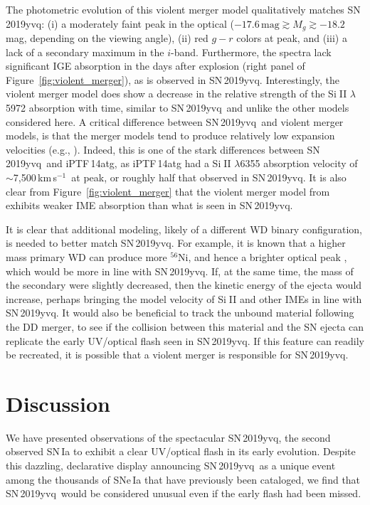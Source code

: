 \documentclass[twocolumn]{aastex63}
\def\ion#1#2{#1$\;${\footnotesize\rm{#2}}\relax}
\newcommand{\kms}{km\,s$^{-1}$}
\newcommand{\radni}{$^{56}$Ni}
\newcommand{\sn}{SN\,2019yvq}
\begin{document}
The photometric evolution of this violent merger model qualitatively matches
\sn: (i) a moderately faint peak in the optical ($-17.6\,\mathrm{mag} \gtrsim
M_g \gtrsim -18.2$\,mag, depending on the viewing angle), (ii) red $g - r$
colors at peak, and (iii) a lack of a secondary maximum in the $i$-band.
Furthermore, the spectra lack significant IGE absorption in the days after
explosion (right panel of Figure~\ref{fig:violent_merger}), as is observed in
\sn. Interestingly, the violent merger model does show a decrease in the
relative strength of the \ion{Si}{II} $\lambda$5972 absorption with time,
similar to \sn\ and unlike the other models considered here. A critical
difference between \sn\ and violent merger models, is that the merger models
tend to produce relatively low expansion velocities (e.g.,
\citealt{Pakmor10,Kromer13a,Kromer16}). Indeed, this is one of the stark
differences between \sn\ and iPTF\,14atg, as iPTF\,14atg had a \ion{Si}{II}
$\lambda$6355 absorption velocity of $\sim$7,500\,\kms\ at peak, or roughly
half that observed in \sn. It is also clear from
Figure~\ref{fig:violent_merger} that the violent merger model from
\citet{Kromer16} exhibits weaker IME absorption than what is seen in \sn.

It is clear that additional modeling, likely of a different WD binary
configuration, is needed to better match \sn. For example, it is known that a
higher mass primary WD can produce more \radni, and hence a brighter optical
peak \citep[e.g.,][]{Pakmor12}, which would be more in line with \sn. If, at
the same time, the mass of the secondary were slightly decreased, then the
kinetic energy of the ejecta would increase, perhaps bringing the model
velocity of \ion{Si}{II} and other IMEs in line with \sn. It would also be
beneficial to track the unbound material following the DD merger, to see if
the collision between this material and the SN ejecta can replicate the early
UV/optical flash seen in \sn. If this feature can readily be recreated, it is
possible that a violent merger is responsible for \sn.

\section{Discussion}\label{sec:conclusions}

We have presented observations of the spectacular \sn, the second observed
SN\,Ia to exhibit a clear UV/optical flash in its early evolution. Despite
this dazzling, declarative display announcing \sn\ as a unique event among the
thousands of SNe\,Ia that have previously been cataloged, we find that \sn\
would be considered unusual even if the early flash had been missed.
\end{document}
